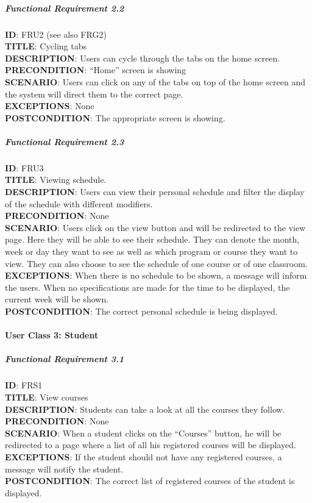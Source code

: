 \documentclass[9pt]{article}
\begin{document}
\subparagraph{Functional Requirement
2.2}\label{functional-requirement-2.2}

\textbf{ID}: FRU2 (see also FRG2)\\\textbf{TITLE}: Cycling
tabs\\\textbf{DESCRIPTION}: Users can cycle through the tabs on the home
screen.\\\textbf{PRECONDITION}: ``Home'' screen is
showing\\\textbf{SCENARIO}: Users can click on any of the tabs on top of
the home screen and the system will direct them to the correct
page.\\\textbf{EXCEPTIONS}: None\\\textbf{POSTCONDITION}: The
appropriate screen is showing.

\subparagraph{Functional Requirement
2.3}\label{functional-requirement-2.3}

\textbf{ID}: FRU3\\\textbf{TITLE}: Viewing
schedule.\\\textbf{DESCRIPTION}: Users can view their personal schedule
and filter the display of the schedule with different
modifiers.\\\textbf{PRECONDITION}: None\\\textbf{SCENARIO}: Users click
on the view button and will be redirected to the view page. Here they
will be able to see their schedule. They can denote the month, week or
day they want to see as well as which program or course they want to
view. They can also choose to see the schedule of one course or of one
classroom.\\\textbf{EXCEPTIONS}: When there is no schedule to be shown,
a message will inform the users. When no specifications are made for the
time to be displayed, the current week will be
shown.\\\textbf{POSTCONDITION}: The correct personal schedule is being
displayed.

\paragraph{User Class 3: Student}\label{user-class-3-student}

\subparagraph{Functional Requirement
3.1}\label{functional-requirement-3.1}

\textbf{ID}: FRS1\\\textbf{TITLE}: View courses\\\textbf{DESCRIPTION}:
Students can take a look at all the courses they
follow.\\\textbf{PRECONDITION}: None\\\textbf{SCENARIO}: When a student
clicks on the ``Courses'' button, he will be redirected to a page where
a list of all his registered courses will be
displayed.\\\textbf{EXCEPTIONS}: If the student should not have any
registered courses, a message will notify the
student.\\\textbf{POSTCONDITION}: The correct list of registered courses
of the student is displayed.
\end{document}
